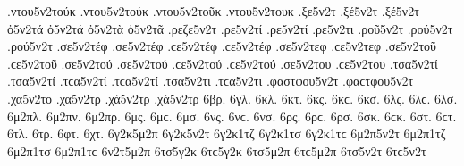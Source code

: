 {.ντου5ν2τούκ .ντου5ν2τούκ   %
.ντου5ν2τοῦκ 
.ντου5ν2τουκ 
.ξε5ν2τ   %
.ξέ5ν2τ .ξέ5ν2τ 
ὀ5ν2τά ὀ5ν2τά   %
ὀ5ν2τὰ 
ὀ5ν2τᾶ 
.ρεζε5ν2τ   %
.ρε5ν2τί .ρε5ν2τί   %
.ρε5ν2τι 
.ροῦ5ν2τ   %
.ρού5ν2τ .ρού5ν2τ 
.σε5ν2τέφ .σε5ν2τέφ .ϲε5ν2τέφ .ϲε5ν2τέφ   %
.σε5ν2τεφ .ϲε5ν2τεφ 
.σε5ν2τοῦ .ϲε5ν2τοῦ   %
.σε5ν2τού .σε5ν2τού .ϲε5ν2τού .ϲε5ν2τού 
.σε5ν2του .ϲε5ν2του 
.τσα5ν2τί .τσα5ν2τί .τϲα5ν2τί .τϲα5ν2τί   %
.τσα5ν2τι .τϲα5ν2τι 
.φαστφου5ν2τ .φαϲτφου5ν2τ   %
.χα5ν2το   %
.χα5ν2τρ   %
.χά5ν2τρ .χά5ν2τρ 
6βρ.   %
6γλ.   %
6κλ.   %
6κτ.   %
6κς. 6κϲ.   %
6κσ. 
6λς. 6λϲ.   %
6λσ. 
6μ2πλ.   %
6μ2πν.   %
6μ2πρ.   %
6μς. 6μϲ.   %
6μσ. 
6νς. 6νϲ.   %
6νσ. 
6ρς. 6ρϲ.   %
6ρσ. 
6σκ. 6ϲκ.   %
6στ. 6ϲτ.   %
6τλ.   %
6τρ.   %
6φτ.   %
6χτ.   %
6γ2κ5μ2π 
6γ2κ5ν2τ 
6γ2κ1τζ 
6γ2κ1τσ 6γ2κ1τϲ 
6μ2π5ν2τ 
6μ2π1τζ 
6μ2π1τσ 6μ2π1τϲ 
6ν2τ5μ2π 
6τσ5γ2κ 6τϲ5γ2κ 
6τσ5μ2π 6τϲ5μ2π 
6τσ5ν2τ 6τϲ5ν2τ 
}
\endgroup
\endinput
